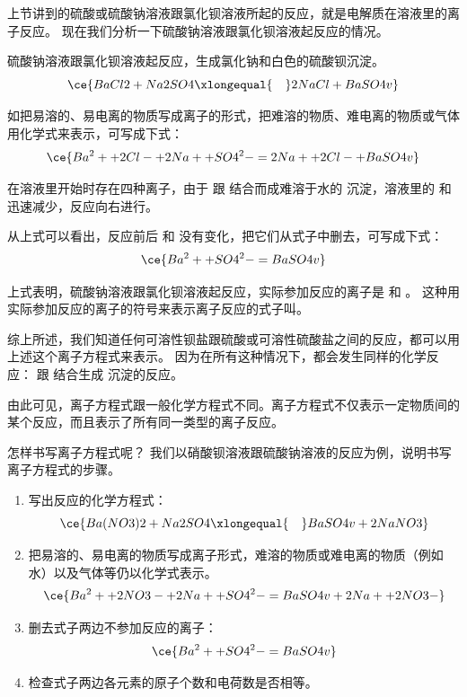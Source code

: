 上节讲到的硫酸或硫酸钠溶液跟氯化钡溶液所起的反应，就是电解质在溶液里的离子反应。
现在我们分析一下硫酸钠溶液跟氯化钡溶液起反应的情况。

硫酸钠溶液跟氯化钡溶液起反应，生成氯化钠和白色的硫酸钡沉淀。
\[ \ce{ BaCl2 + Na2SO4 \xlongequal{\quad} 2NaCl + BaSO4 v} \]

如把易溶的、易电离的物质写成离子的形式，把难溶的物质、难电离的物质或气体用化学式来表示，可写成下式：
\[ \ce{ Ba^2+ + 2Cl- + 2Na+ + SO4^2- = 2Na+ + 2Cl- + BaSO4 v} \]

在溶液里开始时存在四种离子，由于  跟  结合而成难溶于水的  沉淀，溶液里的  和  迅速减少，反应向右进行。

从上式可以看出，反应前后  和  没有变化，把它们从式子中删去，可写成下式：
\[ \ce{ Ba^2+ + SO4^2- = BaSO4 v }\]

上式表明，硫酸钠溶液跟氯化钡溶液起反应，实际参加反应的离子是  和 。
这种用实际参加反应的离子的符号来表示离子反应的式子叫。

综上所述，我们知道任何可溶性钡盐跟硫酸或可溶性硫酸盐之间的反应，都可以用上述这个离子方程式来表示。
因为在所有这种情况下，都会发生同样的化学反应： 跟  结合生成  沉淀的反应。

由此可见，离子方程式跟一般化学方程式不同。离子方程式不仅表示一定物质间的某个反应，而且表示了所有同一类型的离子反应。

怎样书写离子方程式呢？ 我们以硝酸钡溶液跟硫酸钠溶液的反应为例，说明书写离子方程式的步骤。
\begin{enumerate}[label={第\chinese*步，},itemindent=6.5em,labelsep=0pt]
  \item 写出反应的化学方程式：
  \[ \ce{ Ba(NO3)2 + Na2SO4 \xlongequal{\quad} BaSO4 v + 2NaNO3 } \]
  \item 把易溶的、易电离的物质写成离子形式，难溶的物质或难电离的物质（例如水）以及气体等仍以化学式表示。
  \[ \ce{ Ba^2+ + 2NO3- + 2Na+ + SO4^2- = BaSO4 v + 2Na+ + 2NO3-} \]
  \item 删去式子两边不参加反应的离子：
  \[ \ce{ Ba^2+ + SO4^2- = BaSO4 v } \]
  \item 检查式子两边各元素的原子个数和电荷数是否相等。
\end{enumerate}

